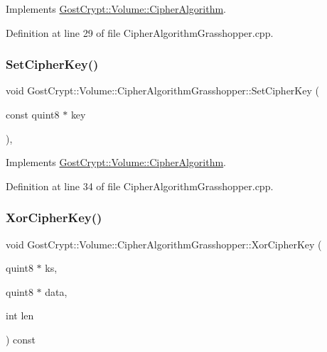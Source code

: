 Implements \hyperlink{class_gost_crypt_1_1_volume_1_1_cipher_algorithm_a8d39c267bba1bea5b7e51b803d426b9c}{Gost\+Crypt\+::\+Volume\+::\+Cipher\+Algorithm}.



Definition at line 29 of file Cipher\+Algorithm\+Grasshopper.\+cpp.

\mbox{\label{class_gost_crypt_1_1_volume_1_1_cipher_algorithm_grasshopper_a32304b5f41ae22a3c461cd03a5b42041}} 
\subsubsection{\texorpdfstring{Set\+Cipher\+Key()}{SetCipherKey()}}
{\footnotesize\ttfamily void Gost\+Crypt\+::\+Volume\+::\+Cipher\+Algorithm\+Grasshopper\+::\+Set\+Cipher\+Key (\begin{DoxyParamCaption}\item[{const quint8 $\ast$}]{key }\end{DoxyParamCaption})\hspace{0.3cm}{\ttfamily [protected]}, {\ttfamily [virtual]}}



Implements \hyperlink{class_gost_crypt_1_1_volume_1_1_cipher_algorithm_a98760f7a389f6fb5fd1d2078d0c1580f}{Gost\+Crypt\+::\+Volume\+::\+Cipher\+Algorithm}.



Definition at line 34 of file Cipher\+Algorithm\+Grasshopper.\+cpp.

\mbox{\label{class_gost_crypt_1_1_volume_1_1_cipher_algorithm_grasshopper_a282165ace19ed71c00dc92e33f0b3738}} 
\subsubsection{\texorpdfstring{Xor\+Cipher\+Key()}{XorCipherKey()}}
{\footnotesize\ttfamily void Gost\+Crypt\+::\+Volume\+::\+Cipher\+Algorithm\+Grasshopper\+::\+Xor\+Cipher\+Key (\begin{DoxyParamCaption}\item[{quint8 $\ast$}]{ks,  }\item[{quint8 $\ast$}]{data,  }\item[{int}]{len }\end{DoxyParamCaption}) const\hspace{0.3cm}{\ttfamily [virtual]}}



